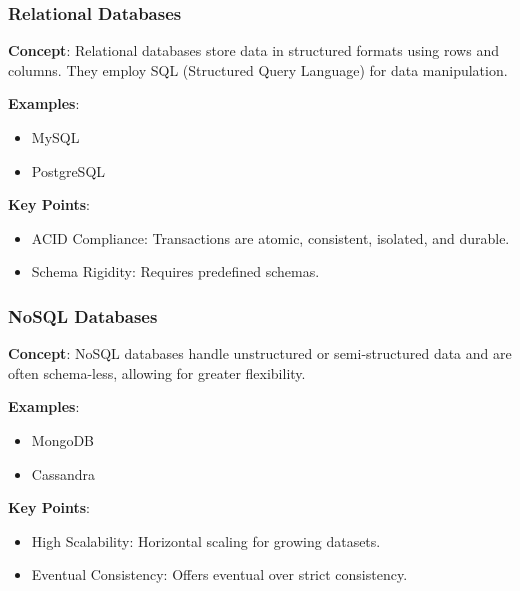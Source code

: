 \documentclass[aspectratio=169]{beamer}
\begin{document}
\begin{frame}[fragile]
    \frametitle{Relational Databases}
    \textbf{Concept}: 
    Relational databases store data in structured formats using rows and columns. They employ SQL (Structured Query Language) for data manipulation.

    \textbf{Examples}:
    \begin{itemize}
        \item MySQL
        \item PostgreSQL
    \end{itemize}

    \textbf{Key Points}:
    \begin{itemize}
        \item ACID Compliance: Transactions are atomic, consistent, isolated, and durable.
        \item Schema Rigidity: Requires predefined schemas.
    \end{itemize}
\end{frame}

\begin{frame}[fragile]
    \frametitle{NoSQL Databases}
    \textbf{Concept}: 
    NoSQL databases handle unstructured or semi-structured data and are often schema-less, allowing for greater flexibility.

    \textbf{Examples}:
    \begin{itemize}
        \item MongoDB
        \item Cassandra
    \end{itemize}

    \textbf{Key Points}:
    \begin{itemize}
        \item High Scalability: Horizontal scaling for growing datasets.
        \item Eventual Consistency: Offers eventual over strict consistency.
    \end{itemize}
\end{frame}
\end{document}
